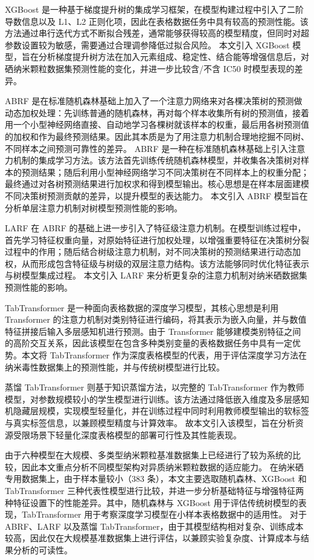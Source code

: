 XGBoost 是一种基于梯度提升树的集成学习框架，在模型构建过程中引入了二阶导数信息以及 L1、L2 正则化项，因此在表格数据任务中具有较高的预测性能。该方法通过串行迭代方式不断拟合残差，通常能够获得较高的模型精度，但同时对超参数设置较为敏感，需要通过合理调参降低过拟合风险。
本文引入 XGBoost 模型，旨在分析梯度提升树方法在加入元素组成、稳定性、结合能等增强信息后，对硒纳米颗粒数据集预测性能的变化，并进一步比较含/不含 IC50 时模型表现的差异。

ABRF 是在标准随机森林基础上加入了一个注意力网络来对各棵决策树的预测做动态加权处理：先训练普通的随机森林，再对每个样本收集所有树的预测值，接着用一个小型神经网络直接、自动地学习各棵树就该样本的权重，最后用各树预测值的加权和作为最终预测结果。因此其本质是为了用注意力机制合理地挖掘不同树、不同样本之间预测可靠性的差异。
ABRF 是一种在标准随机森林基础上引入注意力机制的集成学习方法。该方法首先训练传统随机森林模型，并收集各决策树对样本的预测结果；随后利用小型神经网络学习不同决策树在不同样本上的权重分配；最终通过对各树预测结果进行加权求和得到模型输出。核心思想是在样本层面建模不同决策树预测贡献的差异，以提升模型的表达能力。
本文引入 ABRF 模型旨在分析单层注意力机制对树模型预测性能的影响。


LARF 在 ABRF 的基础上进一步引入了特征级注意力机制。在模型训练过程中，首先学习特征权重向量，对原始特征进行加权处理，以增强重要特征在决策树分裂过程中的作用；随后结合树级注意力机制，对不同决策树的预测结果进行动态加权，从而形成包含特征级与树级的双层注意力结构。该方法能够同时优化特征表示与树模型集成过程。
本文引入 LARF 来分析更复杂的注意力机制对纳米硒数据集预测性能的影响。

TabTransformer 是一种面向表格数据的深度学习模型，其核心思想是利用 Transformer 的注意力机制对类别特征进行编码，将其表示为嵌入向量，并与数值特征拼接后输入多层感知机进行预测。由于 Transformer 能够建模类别特征之间的高阶交互关系，因此该模型在包含多种类别变量的表格数据任务中具有一定优势。本文将 TabTransformer 作为深度表格模型的代表，用于评估深度学习方法在纳米毒性数据集上的预测性能，并与传统树模型进行比较。

蒸馏 TabTransformer 则基于知识蒸馏方法，以完整的 TabTransformer 作为教师模型，对参数规模较小的学生模型进行训练。该方法通过降低嵌入维度及多层感知机隐藏层规模，实现模型轻量化，并在训练过程中同时利用教师模型输出的软标签与真实标签信息，以兼顾模型精度与计算效率。
故本文引入该模型，旨在分析资源受限场景下轻量化深度表格模型的部署可行性及其性能表现。

由于六种模型在大规模、多类型纳米颗粒基准数据集上已经进行了较为系统的比较，因此本文重点分析不同模型架构对异质纳米颗粒数据的适应能力。
在纳米硒专用数据集上，由于样本量较小（383 条），本文主要选取随机森林、XGBoost 和 TabTransformer 三种代表性模型进行比较，并进一步分析基础特征与增强特征两种特征设置下的性能差异。其中，随机森林与 XGBoost 用于评估传统树模型的表现，TabTransformer 用于考察深度学习模型在小样本表格数据中的适用性。
对于 ABRF、LARF 以及蒸馏 TabTransformer，由于其模型结构相对复杂、训练成本较高，因此仅在大规模基准数据集上进行评估，以兼顾实验复杂度、计算成本与结果分析的可读性。

